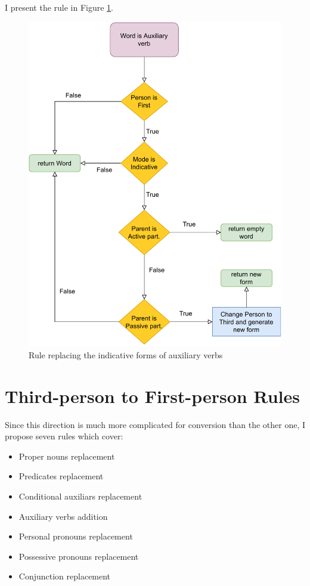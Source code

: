 I present the rule in Figure \ref{fig:icher-auxverb-rule}.

\begin{figure}[!htbp]
\includegraphics[width=\textwidth]{data/Icher-Auxverb-Rule.pdf}
\caption{Rule replacing the indicative forms of auxiliary verbs}
\label{fig:icher-auxverb-rule}
\end{figure}

\section{Third-person to First-person Rules}

Since this direction is much more complicated for conversion than the other one, I propose seven rules which cover:

\begin{itemize}
	\item Proper nouns replacement
	\item Predicates replacement
	\item Conditional auxiliars replacement
	\item Auxiliary verbs addition
	\item Personal pronouns replacement
	\item Possessive pronouns replacement
	\item Conjunction replacement
\end{itemize}

